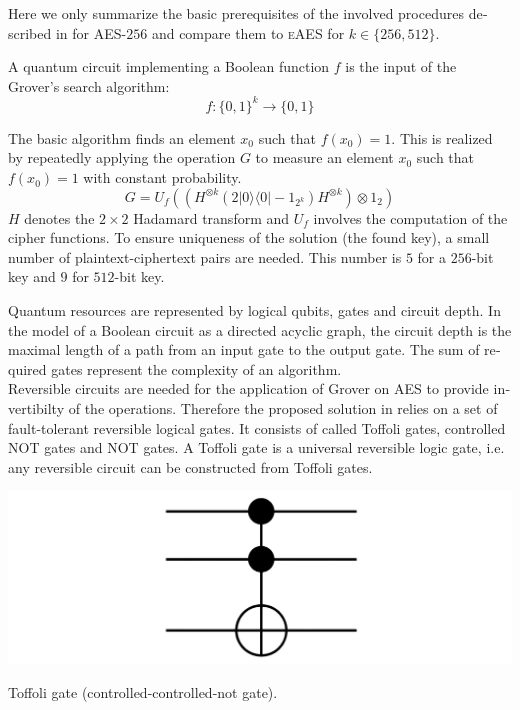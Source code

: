 \documentclass[a4paper,11pt]{article}
\begin{document}
\begin{otherlanguage}{english}
\begin{multicols}{2}
\noindent
Here we only summarize the basic prerequisites of the involved procedures described in \cite{GRO} for \textsc{AES}-$256$ and compare them to \textsc{eAES} for $k \in \{256, 512\}$.

\noindent
A quantum circuit implementing a Boolean function $f$ is the input of the Grover's search algorithm:
$$f: \{ 0,1 \}^k \rightarrow \{ 0,1 \} $$

\noindent
The basic algorithm finds an element $x_0$ such that $f(x_0)=1$. This is realized by repeatedly applying the operation $G$ to measure an element $x_0$ such that $f(x_0)=1$ with constant probability.
$$ G =U_f \left((H^{\otimes k} (2 |0\rangle \langle 0| -1_{2^k})H^{\otimes k})\otimes 1_2 \right)$$
$H$ denotes the $2 \times 2$ Hadamard transform and $U_f$ involves the computation of the cipher functions. To ensure uniqueness of the solution (the found key), a small number of plaintext-ciphertext pairs are needed. This number is $5$ for a $256$-bit key and $9$ for $512$-bit key.

\noindent
Quantum resources are represented by logical qubits, gates and circuit depth. In the model of a Boolean circuit as a directed acyclic graph, the circuit depth is the maximal length of a path from an input gate to the output gate. The sum of required gates represent the complexity of an algorithm.\\

\noindent
Reversible circuits are needed for the application of Grover on \textsc{AES} to provide invertibilty of the operations. Therefore the proposed solution in \cite{GRO} relies on a set of fault-tolerant reversible logical gates. It consists of called Toffoli gates, controlled NOT gates and NOT gates. A Toffoli gate is a universal reversible logic gate, i.e. any reversible circuit can be constructed from Toffoli gates. \\

\begin{figurehere}
  \centering
  \includegraphics[width=\columnwidth]{Toffoli.png}
  \caption{Toffoli gate (controlled-controlled-not gate).\label{abb_5}}
\end{figurehere}
\vspace{0.3cm}


\end{multicols}
\end{otherlanguage}
\end{document}
